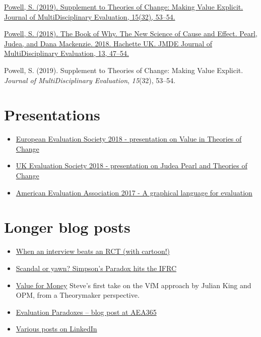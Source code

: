 \documentclass[
]{book}
\providecommand{\tightlist}{%
  \setlength{\itemsep}{0pt}\setlength{\parskip}{0pt}}
\begin{document}
\href{https://journals.sfu.ca/jmde/index.php/jmde_1/article/view/561}{Powell, S. (2019). Supplement to Theories of Change: Making Value Explicit. Journal of MultiDisciplinary Evaluation, 15(32), 53--54.}

\href{https://journals.sfu.ca/jmde/index.php/jmde_1/article/view/507}{Powell, S. (2018). The Book of Why. The New Science of Cause and Effect. Pearl, Judea, and Dana Mackenzie. 2018. Hachette UK. JMDE Journal of MultiDisciplinary Evaluation, 13, 47--54.}

Powell, S. (2019). Supplement to Theories of Change: Making Value Explicit. \emph{Journal of MultiDisciplinary Evaluation}, \emph{15}(32), 53--54.

\hypertarget{presentations}{%
\section{Presentations}\label{presentations}}

\begin{itemize}
\tightlist
\item
  \href{https://drive.google.com/file/d/1FdiOs85iZCqZU6MdU3Lb5kgDOxq36G3b/view?usp=sharing}{European Evaluation Society 2018 - presentation on Value in Theories of Change}
\item
  \href{https://drive.google.com/file/d/1A2gIYmechpCot2QQc0TRWGlFg9r4jsz4/view?usp=sharing}{UK Evaluation Society 2018 - presentation on Judea Pearl and Theories of Change}
\item
  \href{http://comm.eval.org/viewdocument/theorymaker-a-graphical-language}{American Evaluation Association 2017 - A graphical language for evaluation}
\end{itemize}

\hypertarget{longer-blog-posts}{%
\section{Longer blog posts}\label{longer-blog-posts}}

\begin{itemize}
\tightlist
\item
  \href{http://www.pogol.net/public/article-evidence.html}{When an interview beats an RCT (with cartoon!)}
\item
  \href{http://www.pogol.net/_ideas/posts/2019-01-14-scandal-or-yawn-simpsons-paradox-hits-the-ifrc/}{Scandal or yawn? Simpson's Paradox hits the IFRC}
\item
  \href{http://pogol.net/public/article-equity.html}{Value for Money} Steve's first take on the VfM approach by Julian King and OPM, from a Theorymaker perspective.
\item
  \href{https://aea365.org/blog/theories-of-eval-tig-week-evaluation-paradoxes-by-steve-powell/}{Evaluation Paradoxes -- blog post at AEA365}
\item
  \href{https://www.linkedin.com/in/stevepowell99/detail/recent-activity/posts/}{Various posts on LinkedIn}
\end{itemize}
\end{document}
